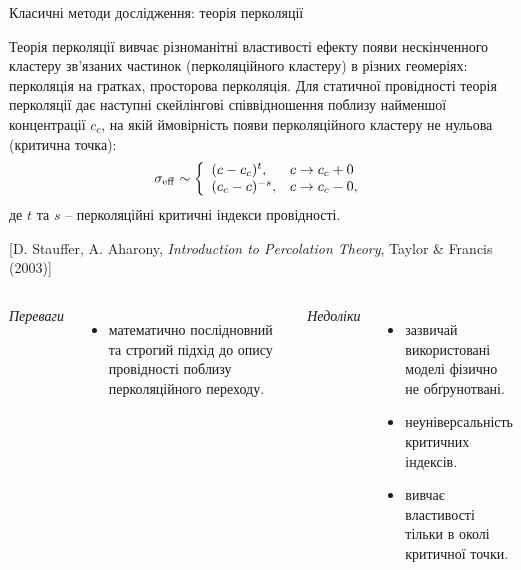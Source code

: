 \documentclass[10pt]{beamer}
\begin{document}
\begin{frame}{Класичні методи дослідження: теорія перколяції}

\footnotesize
    Теорія перколяції вивчає різноманітні властивості ефекту появи нескінченного кластеру зв'язаних частинок (перколяційного кластеру) в різних геомеріях: перколяція на гратках, просторова перколяція. Для статичної провідності теорія перколяції дає наступні скейлінгові співвідношення поблизу найменшої концентрації $c_c$, на якій ймовірність появи перколяційного кластеру не нульова (критична точка):
    \begin{equation}\label{eq:percolation}
        \sigma_{\rm eff} \sim \left\{ \begin{array}{ll}
            (c - c_c)^t, & c \to c_c +0\\
            (c_c - c)^{-s}, & c \to c_c -0,
        \end{array} \right.
    \end{equation}
    де $t$ та $s$ -- перколяційні критичні індекси провідності.
    
    [D. Stauffer, A. Aharony, \textit{Introduction to Percolation Theory}, Taylor \& Francis (2003)]
    \vspace{-5pt}
    \begin{columns}[T,onlytextwidth]
          \begin{center}
          {\it Переваги}
          \end{center}
          \vspace{-10pt}
          \begin{itemize}
              \item математично послідновний та строгий підхід до опису провідності поблизу перколяційного переходу.
          \end{itemize}
    
          \begin{center}
          {\it Недоліки}
          \end{center}
          \vspace{-10pt}
          \begin{itemize}
              \item зазвичай використовані моделі фізично не обґрунотвані.
              \item неуніверсальність критичних індексів.
              \item вивчає властивості тільки в околі критичної точки.
          \end{itemize}
    \end{columns}
  
\end{frame}
\end{document}
